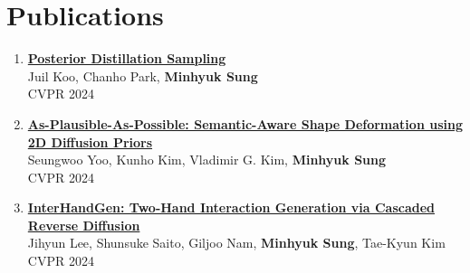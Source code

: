 \documentclass[letterpaper,10pt]{article} %
\newcommand{\blankline}{\quad\pagebreak[2]}
\begin{document}
{%
%
%
%

\newpage



\section{Publications}

\begin{enumerate}

\item \label{cvpr24_3}
\href{https://arxiv.org/abs/2311.13831}{\textbf{Posterior Distillation Sampling}}\\
Juil Koo, Chanho Park, \textbf{Minhyuk Sung}\\
CVPR 2024\\
\blankline

\item \label{cvpr24_2}
\href{https://arxiv.org/abs/2311.16739}{\textbf{As-Plausible-As-Possible: Semantic-Aware Shape Deformation using 2D Diffusion Priors}}\\
Seungwoo Yoo, Kunho Kim, Vladimir G. Kim, \textbf{Minhyuk Sung}\\
CVPR 2024\\
\blankline

\item \label{cvpr24_1}
\href{https://arxiv.org/abs/2403.17422}{\textbf{InterHandGen: Two-Hand Interaction Generation via Cascaded Reverse Diffusion}}\\
Jihyun Lee, Shunsuke Saito, Giljoo Nam, \textbf{Minhyuk Sung}, Tae-Kyun Kim\\
CVPR 2024\\
\blankline


\end{enumerate}}
\end{document}
